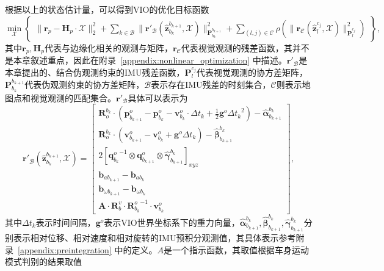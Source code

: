 根据以上的状态估计量，可以得到VIO的优化目标函数
\begin{equation}
  \min_{\mathcal{X}} 
  \begin{Bmatrix} 
  \| \symbf{r}_p - \symbf{H}_p \cdot \mathcal{X} \|^2_2 + \sum_{k\in\mathcal{B}} \| \symbf{r}'_{\mathcal{B}}(\hat{\symbf{z}}_{b_k}^{b_{k+1}}, \mathcal{X}) \|^2_{\symbf{P}_{b_k}^{b_{k+1}}}
  + \sum_{(l,j)\in\mathcal{C}} \rho(\| \symbf{r}_{\mathcal{C}}(\hat{\symbf{z}}_{l}^{c_j}, \mathcal{X}) \|^2_{\symbf{P}_{l}^{c_j}}) \end{Bmatrix},
\end{equation}
其中$\symbf{r}_p, \symbf{H}_p$代表与边缘化相关的观测与矩阵，$\symbf{r}_{\mathcal{C}}$代表视觉观测的残差函数，其并不是本章叙述重点，因此在附录~\ref{appendix:nonlinear_optimization} 中描述。$\symbf{r}'_{\mathcal{B}}$是本章提出的、结合伪观测约束的IMU残差函数，$\symbf{P}_{l}^{c_j}$代表视觉观测的协方差矩阵，$\symbf{P}_{b_k}^{b_{k+1}}$代表伪观测约束的协方差矩阵，$\mathcal{B}$表示存在IMU残差的时刻集合，$\mathcal{C}$则表示地图点和视觉观测的匹配集合。$\symbf{r}'_{\mathcal{B}}$具体可以表示为
\begin{equation}
  \symbf{r}'_{\mathcal{B}}(\hat{\symbf{z}}_{b_k}^{b_{k+1}}, \mathcal{X}) = 
  \begin{bmatrix} 
    \symbf{R}_o^{b_k} \cdot (\symbf{p}_{b_{k+1}}^o -\symbf{p}_{b_k}^o-\symbf{v}_{b_k}^o\cdot\Delta t_k + \frac{1}{2}\symbf{g}^o{\Delta t_k}^2) - \hat{\symbf{\alpha}}_{b_{k+1}}^{b_k} \\
    \symbf{R}_o^{b_k} \cdot (\symbf{v}_{b_{k+1}}^o - \symbf{v}_{b_k}^o + \symbf{g}^o\Delta t_k) - \hat{\symbf{\beta}}_{b_{k+1}}^{b_k} \\
    2[{\symbf{q}^o_{b_k}}^{-1}\otimes\symbf{q}_{b_{k+1}}^o \otimes \hat{\symbf{\gamma}}_{b_{k+1}}^{b_k}]_{xyz} \\
    \symbf{b}_{ab_{k+1}} - \symbf{b}_{ab_{k}} \\
    \symbf{b}_{\omega b_{k+1}} - \symbf{b}_{\omega b_{k}} \\
    \symbf{A} \cdot \symbf{R}_b^v \cdot {\symbf{R}_{b_k}^o}^{-1} \cdot \symbf{v}_{b_k}^o
  \end{bmatrix},
  \label{eq:imu_residual}
\end{equation}
其中$\Delta t_k$表示时间间隔，$\symbf{g}^o$表示VIO世界坐标系下的重力向量，$\hat{\symbf{\alpha}}_{b_{k+1}}^{b_k}, \hat{\symbf{\beta}}_{b_{k+1}}^{b_k}, \hat{\symbf{\gamma}}_{b_{k+1}}^{b_k}$分别表示相对位移、相对速度和相对旋转的IMU预积分观测值，其具体表示参考附录~\ref{appendix:preintegration} 中的定义。$A$是一个指示函数，其取值根据车身运动模式判别的结果取值
